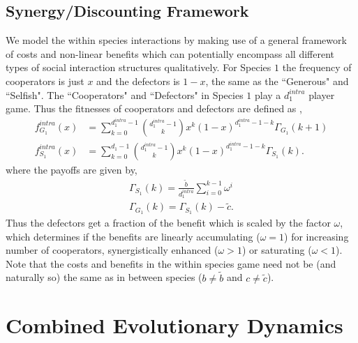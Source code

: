 \documentclass[times,onecolumn]{scrartcl}
\begin{document}
\subsection*{Synergy/Discounting Framework}
We model the within species interactions by making use of a general framework of costs and non-linear benefits \cite{eshel:AmNat:1988,hauert:JTB:2006a} which can potentially encompass all different types of social interaction structures qualitatively.
For Species $1$ the frequency of cooperators is just $x$ and the defectors is $1-x$, the same as the ``Generous" and ``Selfish".
The ``Cooperators" and ``Defectors" in Species $1$ play a $d_1^{intra}$ player game.
Thus the fitnesses of cooperators and defectors are defined as \cite{hauert:JTB:2006a},
%
\begin{align}
	f^{intra}_{G_1} (x) &= \sum_{k=0}^{d_1^{intra} -1} \binom{d_1^{intra} -1}{k}x^k (1-x)^{d_1^{intra} -1-k} \Gamma_{G_1}(k+1) \\
	f^{intra}_{S_1} (x) &= \sum_{k=0}^{d_1 -1} \binom{d_1^{intra} -1}{k}x^k (1-x)^{d_1^{intra} -1-k} \Gamma_{S_1}(k).
\label{intrafiteqs}
\end{align}
%
where the payoffs are given by,
\begin{align}
	\Gamma_{S_1} (k) = \frac{\tilde{b}}{d_1^{intra}} \sum_{i=0}^{k-1} \omega^i \\
	\Gamma_{G_1} (k) = \Gamma_{S_1} (k) - \tilde{c}.
\label{eqintragamepayoffs}
\end{align}
%
Thus the defectors get a fraction of the benefit which is scaled by the factor $\omega$, which determines if the benefits are linearly accumulating ($\omega=1$) for increasing number of cooperators, synergistically enhanced ($\omega>1$) or saturating ($\omega<1$).
Note that the costs and benefits in the within species game need not be (and naturally so) the same as in between species ($b\neq \tilde{b}$ and $c \neq \tilde{c}$).


\section*{Combined Evolutionary Dynamics}
\end{document}
